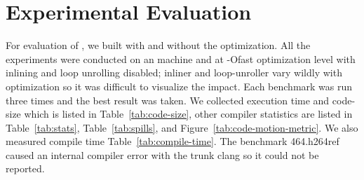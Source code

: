 \documentclass[sigplan,10pt,review,anonymous]{acmart}\settopmatter{printfolios=true,printccs=false,printacmref=false}
\begin{document}
\section{Experimental Evaluation}
\label{sec:experimental-results}
For evaluation of \gcm{}, we built \SPEC{} with and without the \GCM{}
optimization. All the experiments were conducted on an \xlinux{} machine and at
-Ofast optimization level with inlining and loop unrolling disabled; inliner and
loop-unroller vary wildly with \GCM{} optimization so it was difficult to
visualize the impact. Each benchmark was run three times and the best result was
taken. We collected execution time and code-size which is listed in
Table~\ref{tab:code-size}, other compiler statistics are listed in
Table~\ref{tab:stats}, Table~\ref{tab:spills}, and
Figure~\ref{tab:code-motion-metric}.  We also measured compile time
Table~\ref{tab:compile-time}. The benchmark 464.h264ref caused an internal
compiler error with the trunk clang so it could not be reported.
\end{document}
